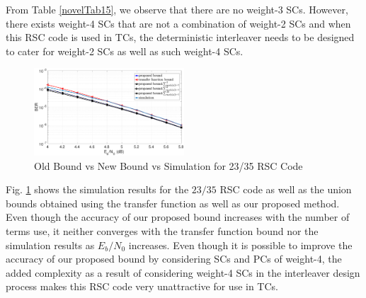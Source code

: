 From Table \ref{novelTab15}, we observe that there are no weight-3 SCs. However, there exists weight-4 SCs that are not a combination of weight-2 SCs and when this RSC code is used in TCs, the deterministic interleaver needs to be designed to cater for weight-2 SCs as well as such weight-4 SCs. 
 
\begin{figure}[htbp]
	\centering
	\includegraphics[width=0.5\textwidth]{./Images/RSC_23_35_lower_weights2.eps}
	\caption{Old Bound vs New Bound vs Simulation for 23/35 RSC Code}
	\label{simFig3}
\end{figure}
Fig. \ref{simFig3} shows the simulation results for the $23/35$ RSC code as well as the union bounds obtained using the transfer function as well as our proposed method. Even though the accuracy of our proposed bound increases with the number of terms use, it neither converges with the transfer function bound nor the simulation results as $E_b/N_0$ increases. Even though it is possible to improve the accuracy of our proposed bound by considering SCs and PCs of weight-4, the added complexity as a result of considering weight-4 SCs in the interleaver design process makes this RSC code very unattractive for use in TCs. 






